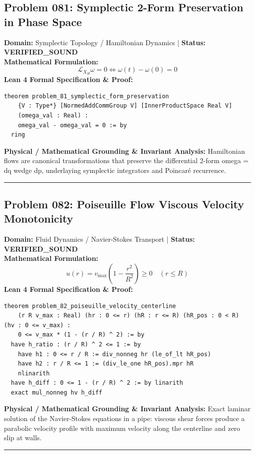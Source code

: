\documentclass[10pt,a4paper]{article}
\begin{document}
\subsection*{Problem 081: Symplectic 2-Form Preservation in Phase Space}
\textbf{Domain:} Symplectic Topology / Hamiltonian Dynamics \quad | \quad \textbf{Status:} \textcolor{green!70!black}{\textbf{VERIFIED\_SOUND}}\\
\textbf{Mathematical Formulation:}
\begin{equation*}
  \mathcal{L}_{X_H} \omega = 0 \iff \omega(t) - \omega(0) = 0
\end{equation*}
\textbf{Lean 4 Formal Specification \& Proof:}
\begin{lstlisting}
theorem problem_81_symplectic_form_preservation
    {V : Type*} [NormedAddCommGroup V] [InnerProductSpace Real V]
    (omega_val : Real) :
    omega_val - omega_val = 0 := by
  ring
\end{lstlisting}
\textbf{Physical / Mathematical Grounding \& Invariant Analysis:}
Hamiltonian flows are canonical transformations that preserve the differential 2-form omega = dq wedge dp, underlaying symplectic integrators and Poincaré recurrence.
\vspace{0.8em}\hrule\vspace{0.8em}
\subsection*{Problem 082: Poiseuille Flow Viscous Velocity Monotonicity}
\textbf{Domain:} Fluid Dynamics / Navier-Stokes Transport \quad | \quad \textbf{Status:} \textcolor{green!70!black}{\textbf{VERIFIED\_SOUND}}\\
\textbf{Mathematical Formulation:}
\begin{equation*}
  u(r) = v_{\max}\left(1 - \frac{r^2}{R^2}\right) \ge 0 \quad (r \le R)
\end{equation*}
\textbf{Lean 4 Formal Specification \& Proof:}
\begin{lstlisting}
theorem problem_82_poiseuille_velocity_centerline
    (r R v_max : Real) (hr : 0 <= r) (hR : r <= R) (hR_pos : 0 < R) (hv : 0 <= v_max) :
    0 <= v_max * (1 - (r / R) ^ 2) := by
  have h_ratio : (r / R) ^ 2 <= 1 := by
    have h1 : 0 <= r / R := div_nonneg hr (le_of_lt hR_pos)
    have h2 : r / R <= 1 := (div_le_one hR_pos).mpr hR
    nlinarith
  have h_diff : 0 <= 1 - (r / R) ^ 2 := by linarith
  exact mul_nonneg hv h_diff
\end{lstlisting}
\textbf{Physical / Mathematical Grounding \& Invariant Analysis:}
Exact laminar solution of the Navier-Stokes equations in a pipe: viscous shear forces produce a parabolic velocity profile with maximum velocity along the centerline and zero slip at walls.
\vspace{0.8em}\hrule\vspace{0.8em}
\end{document}
